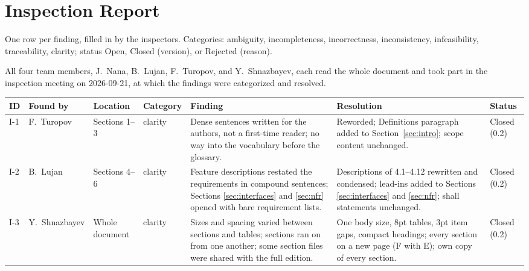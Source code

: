 \clearpage
\section{Inspection Report}\label{app:inspection}

One row per finding, filled in by the inspectors. Categories: ambiguity, incompleteness, incorrectness, inconsistency, infeasibility, traceability, clarity; status Open, Closed (version), or Rejected (reason).

All four team members, J.~Nana, B.~Lujan, F.~Turopov, and Y.~Shnazbayev, each read the whole document and took part in the inspection meeting on 2026-09-21, at which the findings were categorized and resolved.

{\small\renewcommand{\arraystretch}{1.05}
\begin{longtable}{@{}L{0.7cm}L{2.2cm}L{1.7cm}L{1.5cm}L{4.0cm}L{3.5cm}L{1.2cm}@{}}
\toprule
\textbf{ID} & \textbf{Found by} & \textbf{Location} & \textbf{Category} & \textbf{Finding} & \textbf{Resolution} & \textbf{Status} \\
\midrule
\endfirsthead
\bottomrule
\endlastfoot
I-1 & F.~Turopov & Sections 1--3 & clarity & Dense sentences written for the authors, not a first-time reader; no way into the vocabulary before the glossary. & Reworded; Definitions paragraph added to Section~\ref{sec:intro}; scope content unchanged. & Closed (0.2) \\
\midrule
I-2 & B.~Lujan & Sections 4--6 & clarity & Feature descriptions restated the requirements in compound sentences; Sections \ref{sec:interfaces} and \ref{sec:nfr} opened with bare requirement lists. & Descriptions of 4.1--4.12 rewritten and condensed; lead-ins added to Sections \ref{sec:interfaces} and \ref{sec:nfr}; shall statements unchanged. & Closed (0.2) \\
\midrule
I-3 & Y.~Shnazbayev & Whole document & clarity & Sizes and spacing varied between sections and tables; sections ran on from one another; some section files were shared with the full edition. & One body size, 8pt tables, 3pt item gaps, compact headings; every section on a new page (F with E); own copy of every section. & Closed (0.2) \\
\end{longtable}
}
